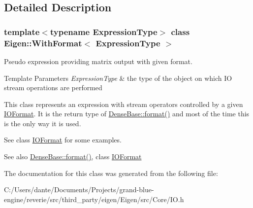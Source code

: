 \subsection{Detailed Description}
\subsubsection*{template$<$typename Expression\+Type$>$\newline
class Eigen\+::\+With\+Format$<$ Expression\+Type $>$}

Pseudo expression providing matrix output with given format. 


\begin{DoxyTemplParams}{Template Parameters}
{\em Expression\+Type} & the type of the object on which IO stream operations are performed\\
\hline
\end{DoxyTemplParams}
This class represents an expression with stream operators controlled by a given \mbox{\hyperlink{struct_eigen_1_1_i_o_format}{I\+O\+Format}}. It is the return type of \mbox{\hyperlink{class_eigen_1_1_dense_base_ab231f1a6057f28d4244145e12c9fc0c7}{Dense\+Base\+::format()}} and most of the time this is the only way it is used.

See class \mbox{\hyperlink{struct_eigen_1_1_i_o_format}{I\+O\+Format}} for some examples.

\begin{DoxySeeAlso}{See also}
\mbox{\hyperlink{class_eigen_1_1_dense_base_ab231f1a6057f28d4244145e12c9fc0c7}{Dense\+Base\+::format()}}, class \mbox{\hyperlink{struct_eigen_1_1_i_o_format}{I\+O\+Format}} 
\end{DoxySeeAlso}


The documentation for this class was generated from the following file\+:\begin{DoxyCompactItemize}
\item 
C\+:/\+Users/dante/\+Documents/\+Projects/grand-\/blue-\/engine/reverie/src/third\+\_\+party/eigen/\+Eigen/src/\+Core/I\+O.\+h\end{DoxyCompactItemize}
